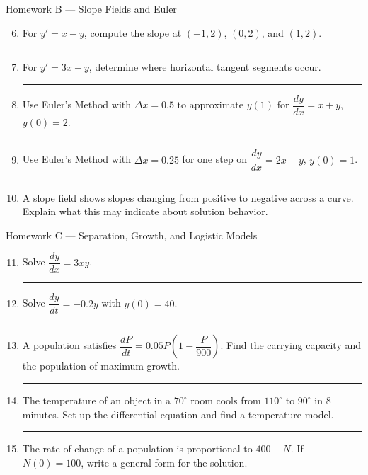 \documentclass[11pt]{article}
\newcommand{\hwspace}{\vspace{0.8em}\hrule\vspace{0.8em}}
\begin{document}
\begin{homeworkset}{Homework B --- Slope Fields and Euler}
\begin{enumerate}
\setcounter{enumi}{5}
    \item For \(y'=x-y\), compute the slope at \((-1,2)\), \((0,2)\), and \((1,2)\).
    \hwspace

    \item For \(y'=3x-y\), determine where horizontal tangent segments occur.
    \hwspace

    \item Use Euler’s Method with \(\Delta x=0.5\) to approximate \(y(1)\) for \(\dfrac{dy}{dx}=x+y\), \(y(0)=2\).
    \hwspace

    \item Use Euler’s Method with \(\Delta x=0.25\) for one step on \(\dfrac{dy}{dx}=2x-y\), \(y(0)=1\).
    \hwspace

    \item A slope field shows slopes changing from positive to negative across a curve. Explain what this may indicate about solution behavior.
\end{enumerate}
\end{homeworkset}
\newpage
\begin{homeworkset}{Homework C --- Separation, Growth, and Logistic Models}
\begin{enumerate}
\setcounter{enumi}{10}
    \item Solve \(\dfrac{dy}{dx}=3xy\).
    \hwspace

    \item Solve \(\dfrac{dy}{dt}=-0.2y\) with \(y(0)=40\).
    \hwspace

    \item A population satisfies \(\dfrac{dP}{dt}=0.05P\left(1-\dfrac{P}{900}\right)\). Find the carrying capacity and the population of maximum growth.
    \hwspace

    \item The temperature of an object in a \(70^\circ\) room cools from \(110^\circ\) to \(90^\circ\) in 8 minutes. Set up the differential equation and find a temperature model.
    \hwspace

    \item The rate of change of a population is proportional to \(400-N\). If \(N(0)=100\), write a general form for the solution.
\end{enumerate}
\end{homeworkset}

\newpage
\end{document}
